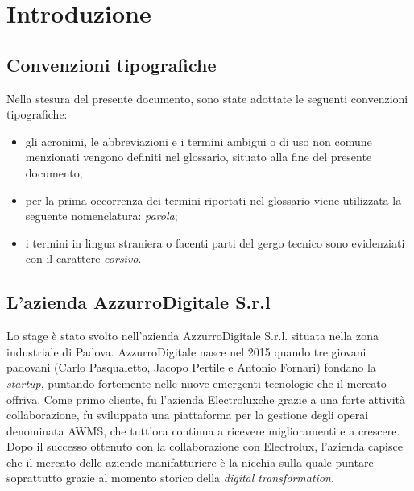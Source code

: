 
\chapter{Introduzione}
\label{cap:introduzione}

\section{Convenzioni tipografiche}
Nella stesura del presente documento, sono state adottate le seguenti convenzioni tipografiche:
\begin{itemize}
	\item gli acronimi, le abbreviazioni e i termini ambigui o di uso non comune menzionati vengono definiti nel glossario, situato alla fine del presente documento;
	\item per la prima occorrenza dei termini riportati nel glossario viene utilizzata la seguente nomenclatura: \emph{parola}\glsfirstoccur;
	\item i termini in lingua straniera o facenti parti del gergo tecnico sono evidenziati con il carattere \emph{corsivo}.
\end{itemize}




\section{L'azienda AzzurroDigitale S.r.l}

Lo stage è stato svolto nell'azienda AzzurroDigitale S.r.l. situata nella zona industriale di Padova. AzzurroDigitale nasce nel 2015 quando tre giovani padovani (Carlo Pasqualetto, Jacopo Pertile e Antonio Fornari) fondano la \emph{startup}, puntando fortemente nelle nuove emergenti tecnologie che il mercato offriva. Come primo cliente, fu l'azienda 	\gls{Electrolux}\glsfirstoccur che grazie a una forte attività collaborazione, fu sviluppata una piattaforma per la gestione degli operai denominata \gls{AWMS}\glsfirstoccur, che tutt’ora continua a ricevere miglioramenti e a crescere. Dopo il successo ottenuto con la collaborazione con \gls{Electrolux}, l'azienda capisce che il mercato delle aziende manifatturiere è la nicchia sulla quale puntare soprattutto grazie al momento storico della \emph{digital transformation}. 

